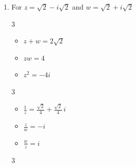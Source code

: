 \documentclass{ximera}
\begin{document}
\begin{enumerate}
\begin{multicols}{3}
\begin{itemize}
\end{itemize}

\end{multicols}

\begin{multicols}{3}

\begin{itemize}

\item $\overline{z} = -5-i$

\item $z\overline{z} = 26$

\item $(\overline{z})^2 = 24+10i$

\end{itemize}

\end{multicols}

\item  For  $z = \sqrt{2} - i\sqrt{2}$ and $w = \sqrt{2} + i\sqrt{2}$

\begin{multicols}{3}

\begin{itemize}

\item $z+w = 2\sqrt{2}$

\item $zw = 4$

\item $z^2 = -4i$

\end{itemize}

\end{multicols}

\begin{multicols}{3}

\begin{itemize}

\item $\frac{1}{z} = \frac{\sqrt{2}}{4} + \frac{\sqrt{2}}{4} \,i$

\item $\frac{z}{w} = -i$

\item $\frac{w}{z} = i$

\end{itemize}

\end{multicols}

\begin{multicols}{3}


\end{multicols}
\end{enumerate}
\end{document}
